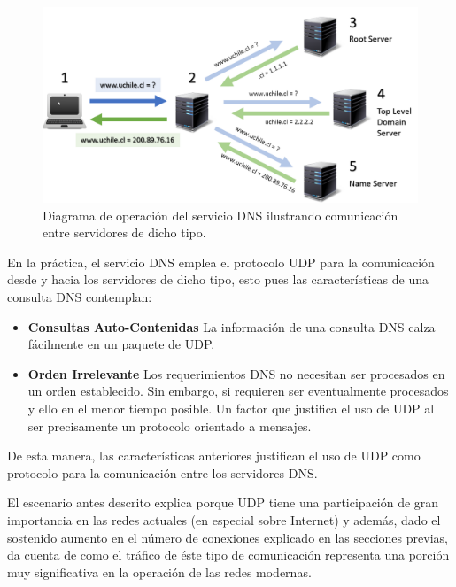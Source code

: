 \begin{figure}[!h]
	\centering
	\includegraphics[scale=0.7]{imagenes/dns-system}
	\caption{Diagrama de operación del servicio DNS ilustrando comunicación entre servidores de dicho tipo.}
	\label{fig:dns}
\end{figure}

En la práctica, el servicio DNS emplea el protocolo UDP para la comunicación desde y hacia los servidores de dicho tipo, esto pues las características de una consulta DNS contemplan:

\begin{itemize}
\item \textbf{Consultas Auto-Contenidas} La información de una consulta DNS calza fácilmente en un paquete de UDP.
\item \textbf{Orden Irrelevante} Los requerimientos DNS no necesitan ser procesados en un orden establecido. Sin embargo, si requieren ser eventualmente procesados y ello en el menor tiempo posible. Un factor que justifica el uso de UDP al ser precisamente un protocolo orientado a mensajes.
\end{itemize}

De esta manera, las características anteriores justifican el uso de UDP como protocolo para la comunicación entre los servidores DNS.

El escenario antes descrito explica porque UDP tiene una participación de gran importancia en las redes actuales (en especial sobre Internet) y además, dado el sostenido aumento en el número de conexiones explicado en las secciones previas, da cuenta de como el tráfico de éste tipo de comunicación representa una porción muy significativa en la operación de las redes modernas.


